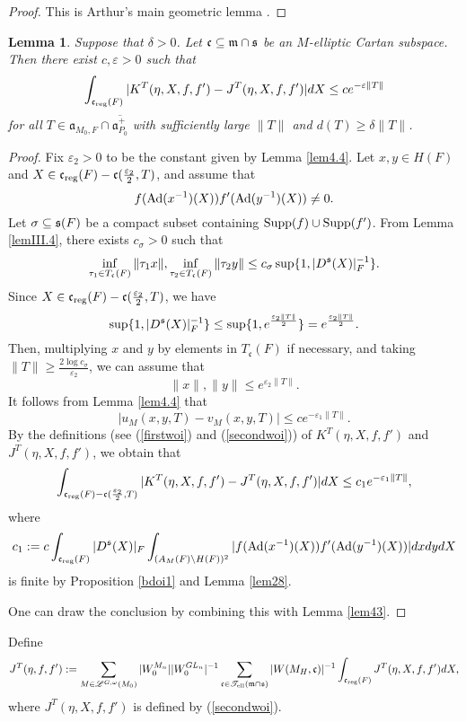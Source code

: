 \documentclass[a4paper]{amsart}
\newcommand{\fa}{{\mathfrak{a}}} \newcommand{\fb}{{\mathfrak{b}}}\newcommand{\fc}{{\mathfrak{c}}} \newcommand{\fd}{{\mathfrak{d}}}
\newcommand{\fm}{{\mathfrak{m}}} \newcommand{\fn}{{\mathfrak{n}}}\newcommand{\fo}{{\mathfrak{o}}} \newcommand{\fp}{{\mathfrak{p}}}
\newcommand{\ov}{\overline}
\newtheorem{lem}[thm]{Lemma}
\theoremstyle{definition}
\theoremstyle{remark}
\numberwithin{equation}{subsection}
\begin{document}
\begin{proof}
This is Arthur's main geometric lemma \cite[Lemma 4.4]{MR1114210}. 
\end{proof}

\begin{lem}\label{lemofprop45}
Suppose that $\delta>0$. Let $\fc\subseteq\fm\cap\fs$ be an $M$-elliptic Cartan subspace. Then there exist $c, \varepsilon>0$ such that
$$ \int_{\fc_\reg(F)} |K^T(\eta, X, f, f') - J^T(\eta, X, f, f')| dX \leq c e^{-\varepsilon\| T\|} $$
for all $T\in\fa_{M_0,F}\cap\ov{\fa_{P_0}^+}$ with sufficiently large $\|T\|$ and $d(T)\geq\delta\| T\|$. 
\end{lem}

\begin{proof}
Fix $\varepsilon_2>0$ to be the constant given by Lemma \ref{lem4.4}. Let $x,y\in H(F)$ and $X\in\fc_\reg(F)-\fc(\frac{\varepsilon_2}{2},T)$, and assume that
$$ f({\mathrm{Ad}}(x^{-1})(X))f'({\mathrm{Ad}}(y^{-1})(X))\neq0. $$
Let $\sigma\subseteq{\mathfrak{s}}(F)$ be a compact subset containing ${\mathrm{Supp}}(f)\cup{\mathrm{Supp}}(f')$. From Lemma \ref{lemIII.4}, there exists $c_\sigma>0$ such that
$$ \inf_{\tau_1\in T_\fc(F)} \|\tau_1 x\|, \inf_{\tau_2\in T_\fc(F)} \|\tau_2 y\|\leq c_\sigma\sup\{1,|D^\fs(X)|_F^{-1}\}. $$
Since $X\in\fc_\reg(F)-\fc(\frac{\varepsilon_2}{2},T)$, we have
$$ \sup\{1,|D^{\mathfrak{s}}(X)|_F^{-1}\}\leq\sup\{1,e^{\frac{\varepsilon_2\|T\|}{2}}\}=e^{\frac{\varepsilon_2\|T\|}{2}}. $$
Then, multiplying $x$ and $y$ by elements in $T_\fc(F)$ if necessary, and taking $\|T\|\geq\frac{2\log c_\sigma}{\varepsilon_2}$, we can assume that
$$ \|x\|,\|y\|\leq e^{\varepsilon_2\|T\|}. $$
It follows from Lemma \ref{lem4.4} that
$$ |u_M(x,y,T)-v_M(x,y,T)|\leq ce^{-\varepsilon_1\|T\|}. $$
By the definitions (see (\ref{firstwoi}) and (\ref{secondwoi})) of $K^T(\eta, X, f, f')$ and $J^T(\eta, X, f, f')$, we obtain that
$$ \int_{\fc_\reg(F)-\fc(\frac{\varepsilon_2}{2},T)} |K^T(\eta, X, f, f')-J^T(\eta, X, f, f')| dX\leq c_1 e^{-\varepsilon_1\| T\|}, $$
where
$$ c_1:=c \int_{\fc_\reg(F)} |D^\fs(X)|_F \int_{(A_M(F)\bs H(F))^2} |f(\Ad(x^{-1})(X)) f'(\Ad(y^{-1})(X))| dx dy dX $$
is finite by Proposition \ref{bdoi1} and Lemma \ref{lem28}. 

One can draw the conclusion by combining this with Lemma \ref{lem43}. 
\end{proof}

Define
$$ J^T(\eta, f, f'):=\sum_{M\in\msl^{G,\omega}(M_0)} |W_0^{M_n}| |W_0^{GL_n}|^{-1} \sum_{\fc\in\mst_\el(\fm\cap\fs)} |W(M_H, \fc)|^{-1} \int_{\fc_\reg(F)} J^T(\eta, X, f, f') dX, $$
where $J^T(\eta, X, f, f')$ is defined by (\ref{secondwoi}). 
\end{document}
